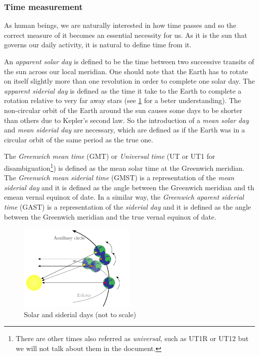\documentclass[../main.tex]{subfiles}
\begin{document}
\subsubsection{Time measurement}
As human beings, we are naturally interested in how time passes and so the correct measure of it becomes an essential necessity for us. As it is the sun that governs our daily activity, it is natural to define time from it.

An \emph{apparent solar day} is defined to be the time between two successive transits of the sun across our local meridian. One should note that the Earth has to rotate on itself slightly more than one revolution in order to complete one solar day. The \emph{apparent siderial day} is defined as the time it take to the Earth to complete a rotation relative to very far away stars (see \cref{fig:siderial} for a beter understanding). The non-circular orbit of the Earth around the sun causes some days to be shorter than others due to Kepler's second law. So the introduction of a \emph{mean solar day} and \emph{mean siderial day} are necessary, which are defined as if the Earth was in a circular orbit of the same period as the true one.

\begin{definition}
  The \emph{Greenwich mean time} (GMT) or \emph{Universal time} (UT or UT1 for disambiguation\footnote{There are other times also referred as \emph{universal}, such as UT1R or UT12 but we will not talk about them in the document.}) is defined as the mean solar time at the Greenwich meridian. The \emph{Greenwich mean siderial time} (GMST) is a representation of the \emph{mean siderial day} and it is defined as the angle between the Greenwich meridian and th emean vernal equinox of date. In a similar way, the \emph{Greenwich aparent siderial time} (GAST) is a representation of the \emph{siderial day} and it is defined as the angle between the Greenwich meridian and the true vernal equinox of date.
\end{definition}

\begin{figure}[ht]
  \centering
  \includegraphics[width=0.5\textwidth]{Images/siderial.pdf}
  \caption{Solar and siderial days (not to scale)}
  \label{fig:siderial}
\end{figure}
\end{document}
